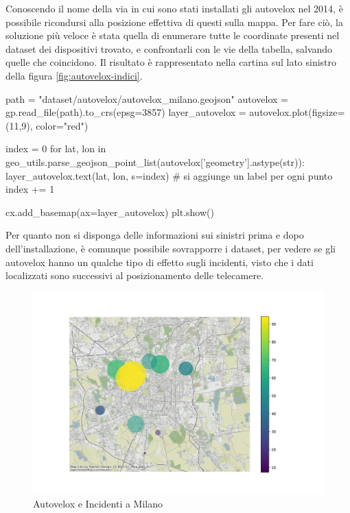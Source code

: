 \documentclass[a4paper,12pt]{report}
\begin{document}
Conoscendo il nome della via in cui sono stati installati gli autovelox nel 2014, 
è possibile ricondursi alla posizione effettiva di questi sulla mappa. 
Per fare ciò, la soluzione più veloce è stata quella di enumerare tutte le coordinate presenti 
nel dataset dei dispositivi trovato, 
e confrontarli con le vie della tabella, salvando quelle che coincidono. 
Il risultato è rappresentato nella cartina sul lato sinistro della 
figura \ref{fig:autovelox-indici}. 

\begin{code}[language=Python]
path = "dataset/autovelox/autovelox_milano.geojson"
autovelox = gp.read_file(path).to_crs(epsg=3857)
layer_autovelox = autovelox.plot(figsize=(11,9), color="red")
    
index = 0
for lat, lon in geo_utils.parse_geojson_point_list(autovelox['geometry'].astype(str)):
    layer_autovelox.text(lat, lon, s=index)
    # si aggiunge un label per ogni punto
    index += 1
    
cx.add_basemap(ax=layer_autovelox)
plt.show()
\end{code}

Per quanto non si disponga delle informazioni sui sinistri prima e dopo dell'installazione, 
è comunque possibile sovrapporre i dataset, per vedere se gli autovelox 
hanno un qualche tipo di effetto sugli incidenti, visto che i dati 
localizzati sono successivi al posizionamento delle telecamere. 

\begin{figure}
    \includegraphics[width=\linewidth]{../src/autovelox/autovelox_incidenti.png}
    \caption{Autovelox e Incidenti a Milano}
    \label{fig:autovelox-incidenti}
\end{figure}
\end{document}
